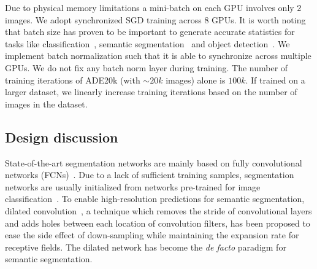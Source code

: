 \documentclass[runningheads]{llncs}
\begin{document}
Due to physical memory limitations a mini-batch on each GPU involves only $2$ images. We adopt synchronized SGD training across $8$ GPUs. It is worth noting that batch size has proven to be important to generate accurate statistics for tasks like classification~\cite{ioffe2017batch}, semantic segmentation~\cite{zhao2017pyramid} and object detection~\cite{peng2017megdet}. We implement batch normalization such that it is able to synchronize across multiple GPUs. We do not fix any batch norm layer during training. The number of training iterations of ADE20k (with $\sim{}20k$ images) alone is $100k$. If trained on a larger dataset, we linearly increase training iterations based on the number of images in the dataset.

\subsection{Design discussion}
State-of-the-art segmentation networks are mainly based on fully convolutional networks (FCNs)~\cite{long2015fully}. Due to a lack of sufficient training samples, segmentation networks are usually initialized from networks pre-trained for image classification~\cite{deng2009imagenet,krizhevsky2012imagenet,simonyan2014very}. To enable high-resolution predictions for semantic segmentation, dilated convolution~\cite{yu2015multi}, a technique which removes the stride of convolutional layers and adds holes between each location of convolution filters, has been proposed to ease the side effect of down-sampling while maintaining the expansion rate for receptive fields. The dilated network has become the \textit{de facto} paradigm for semantic segmentation.
\end{document}
